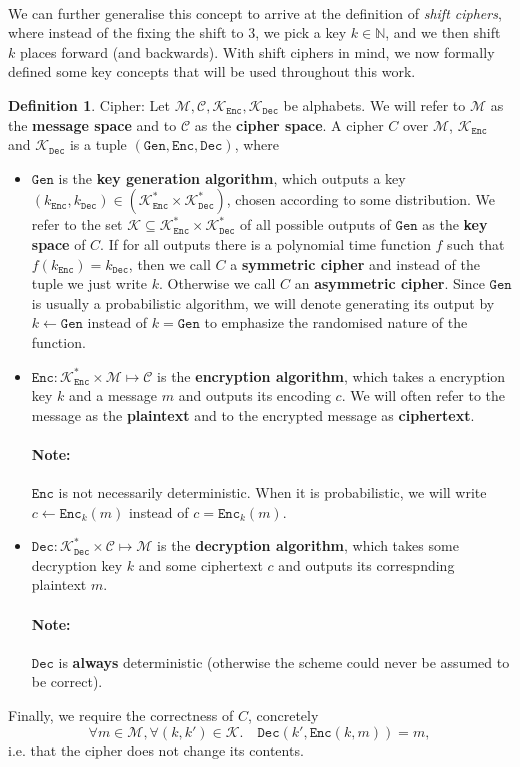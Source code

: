 \documentclass{article}
\theoremstyle{definition}
\newtheorem{definition}{Definition}[section]
\theoremstyle{example}
\newcommand{\Enc}{\texttt{Enc}}
\newcommand{\Dec}{\texttt{Dec}}
\newcommand{\Gen}{\texttt{Gen}}
\newcommand{\M}{\mathcal{M}}
\renewcommand{\C}{\mathcal{C}}
\newcommand{\K}{\mathcal{K}}
\begin{document}
\paragraph{}
We can further generalise this concept to arrive at the definition of
\textit{shift ciphers}, where instead of the fixing the shift to 3, we pick a
key $k \in \mathbb{N}$, and we then shift $k$ places forward (and backwards).
With shift ciphers in mind, we now formally defined some key concepts that will
be used throughout this work.
\begin{definition}{Cipher:}
  Let $\M, \C, \K_\Enc, \K_\Dec$ be alphabets. We will refer to $\M$
  as the \textbf{message space} and to $\C$ as the \textbf{cipher space}.
  A cipher $C$ over $\M$, $\K_\Enc$ and $\K_\Dec$ is a tuple $(\Gen, \Enc, \Dec)$, where
  \begin{itemize}
  \item $\Gen$ is the \textbf{key generation algorithm}, which outputs a key
    $(k_\Enc, k_\Dec) \in (\K_\Enc^* \times \K_\Dec^*)$, chosen according to some
    distribution. We refer to the set $\K\subseteq \K_\Enc^* \times \K_\Dec^*$ of all possible outputs of $\Gen$ as the
    \textbf{key space} of $C$. If for all outputs there is a polynomial time
    function $f$ such that $f(k_\Enc) = k_\Dec$, then we call $C$
    a \textbf{symmetric cipher} and instead of the tuple we just write $k$.
    Otherwise we call $C$ an \textbf{asymmetric cipher}.
    Since $\Gen$ is usually a probabilistic algorithm, we will denote generating
    its output by $k \leftarrow \Gen$ instead of $k = \Gen$ to emphasize the
    randomised nature of the function.
  \item $\Enc: \K_\Enc^*\times\M\mapsto \C$ is the \textbf{encryption algorithm}, which takes
    a encryption key $k$ and a message $m$ and outputs its encoding $c$. We will often
    refer to the message as the \textbf{plaintext} and to the encrypted message
    as \textbf{ciphertext}.
    \paragraph{Note:} $\Enc$ is not necessarily deterministic. When it is
    probabilistic, we will write $c \leftarrow \Enc_k(m)$ instead of $c = \Enc_k(m)$.
  \item $\Dec: \K_\Dec^*\times\C \mapsto \M$ is the \textbf{decryption algorithm}, which
    takes some decryption key $k$ and some ciphertext $c$ and outputs its
    correspnding plaintext $m$. 
    \paragraph{Note:} $\Dec$ is \textbf{always} deterministic (otherwise the
    scheme could never be assumed to be correct).
  \end{itemize}
  Finally, we require the correctness of $C$, concretely
  \[
    \forall m \in \M, \forall (k, k') \in \K. \quad \Dec(k', \Enc(k, m)) = m,
  \]
  i.e. that the cipher does not change its contents.
\end{definition}
\end{document}
